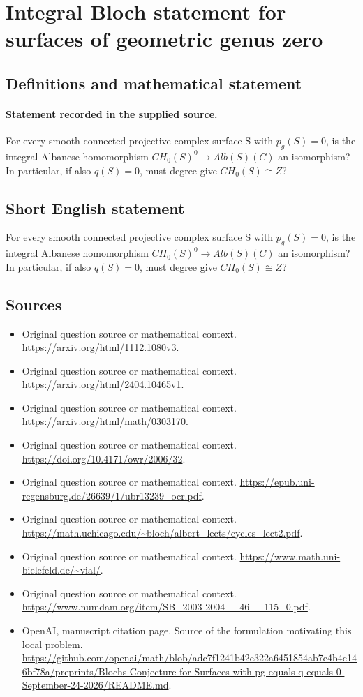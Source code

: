 \documentclass[11pt]{article}
\begin{document}
\section*{Integral Bloch statement for surfaces of geometric genus zero}\label{30007012}
\subsection{Definitions and mathematical statement}
\paragraph{Statement recorded in the supplied source.}
For every smooth connected projective complex surface S with $p_g(S)=0$, is the integral Albanese homomorphism $CH_{0}(S)^0\to Alb(S)(C)$ an isomorphism? In particular, if also $q(S)=0$, must degree give $CH_{0}(S)\cong Z$?
\subsection{Short English statement}
For every smooth connected projective complex surface S with $p_g(S)=0$, is the integral Albanese homomorphism $CH_{0}(S)^0\to Alb(S)(C)$ an isomorphism? In particular, if also $q(S)=0$, must degree give $CH_{0}(S)\cong Z$?
\subsection{Sources}
\begin{itemize}
\item[S1] Original question source or mathematical context.
\url{https://arxiv.org/html/1112.1080v3}.
\item[S2] Original question source or mathematical context.
\url{https://arxiv.org/html/2404.10465v1}.
\item[S3] Original question source or mathematical context.
\url{https://arxiv.org/html/math/0303170}.
\item[S4] Original question source or mathematical context.
\url{https://doi.org/10.4171/owr/2006/32}.
\item[S5] Original question source or mathematical context.
\url{https://epub.uni-regensburg.de/26639/1/ubr13239_ocr.pdf}.
\item[S6] Original question source or mathematical context.
\url{https://math.uchicago.edu/~bloch/albert_lects/cycles_lect2.pdf}.
\item[S7] Original question source or mathematical context.
\url{https://www.math.uni-bielefeld.de/~vial/}.
\item[S8] Original question source or mathematical context.
\url{https://www.numdam.org/item/SB_2003-2004__46__115_0.pdf}.
\item[S9] OpenAI, manuscript citation page. Source of the formulation motivating this local problem.
\url{https://github.com/openai/math/blob/adc7f1241b42e322a6451854ab7e4b4c146bf78a/preprints/Blochs-Conjecture-for-Surfaces-with-pg-equals-q-equals-0-September-24-2026/README.md}.
\end{itemize}
\end{document}
